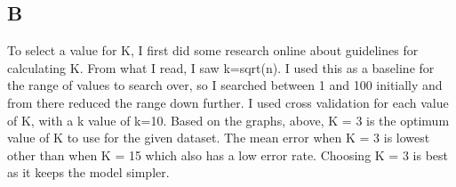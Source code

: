 \documentclass[11pt]{article} %
\begin{document}
\subsection{B}
\begin{figure}[h]
\centering
{}
\qquad
{}
\qquad
\end{figure}
To select a value for K, I first did some research online about guidelines for calculating K. From what I read, I saw k=sqrt(n). I used this as a baseline for the range of values to search over, so I searched between 1 and 100 initially and from there reduced the range down further. I used cross validation for each value of K, with a k value of k=10. Based on the graphs, above, K = 3 is the optimum value of K to use for the given dataset. The mean error when K = 3 is lowest other than when K = 15 which also has a low error rate. Choosing K = 3 is best as it keeps the model simpler.
\end{document}
